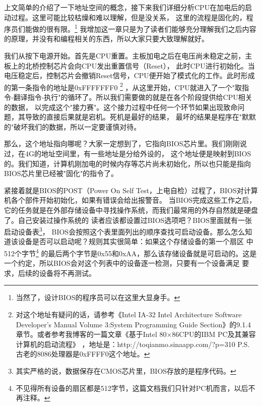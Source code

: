 \par 上文简单的介绍了一下地址空间的概念，接下来我们详细分析CPU在加电后的启动过程。这里可能比较枯燥和难以理解，但是没关系，\allowbreak
这里的流程是固化的，程序员们能做的很有限。\footnote{当然了，设计BIOS的程序员可以在这里大显身手。}\allowbreak
我增加这一章只是为了读者们能够充分理解我们之后内容的原理，并没有和编程相关的东西，所以大家只要大致理解就好。

\par 我们从按下电源开始。首先是CPU重置。主板加电之后在电压尚未稳定之前，主板上的北桥控制芯片会向CPU发出重置信号（Reset），\allowbreak
此时CPU进行初始化。当电压稳定后，控制芯片会撤销Reset信号，CPU便开始了模式化的工作。此时形成的第一条指令的地址是0xFFFFFFF0\allowbreak
\footnote{对这个地址有疑问的话，请参考《Intel IA-32 Intel Architecture Software Developer’s Manual Volume 3:System \allowbreak
Programming Guide Section》的9.1.4 章节。或者参考我博客的一篇文章《基于Intel 80×86CPU的IBM PC及其兼容计算机的启动流程》\allowbreak
，地址是：http://toqianmo.sinaapp.com/?p=310 P.S. 古老的8086处理器是0xFFFF0这个地址。}\allowbreak
，从这里开始，CPU就进入了一个"取指令-翻译指令-执行"的循环了。所以我们需要做的就是在各个阶段提供给CPU相关的数据，\allowbreak
以完成这个"接力赛"。这个接力过程中任何一个环节如果出现致命问题，其导致的直接后果就是宕机。死机是最好的结果，\allowbreak
最坏的结果是程序在"默默的"破坏我们的数据，所以一定要谨慎对待。

\par 那么，这个地址指向哪呢？大家一定想到了，它指向BIOS芯片里。我们刚刚说过，在4G的地址空间里，有一些地址是分给外设的，\allowbreak
这个地址便是映射到BIOS的。我们知道，计算机刚加电的时候内存等芯片尚未初始化，所以也只能是指向BIOS芯片里已经被"固化"的指令了。\allowbreak

\par 紧接着就是BIOS的POST（Power On Self Test，上电自检）过程了，BIOS对计算机各个部件开始初始化，如果有错误会给出报警音。\allowbreak
当BIOS完成这些工作之后，它的任务就是在外部存储设备中寻找操作系统，而我们最常用的外存自然就是硬盘了。自己安装过操作系统的\allowbreak
读者应该都设置过BIOS选项吧？BIOS里面就有一张启动设备表\footnote{其实严格的说，数据保存在CMOS芯片里，BIOS存放的是程序代码。}，\allowbreak
BIOS会按照这个表里面列出的顺序查找可启动设备。那么怎么知道该设备是否可以启动呢？规则其实很简单：如果这个存储设备的第一个扇区\allowbreak
中512个字节\footnote{不见得所有设备的扇区都是512字节，这篇文档我们只针对PC机而言，以后不再注释。}\allowbreak
的最后两个字节是0x55和0xAA，那么该存储设备就是可启动的。这是一个约定，所以BIOS会对这个列表中的设备逐一检测，只要有一个设备满足\allowbreak
要求，后续的设备将不再测试。


